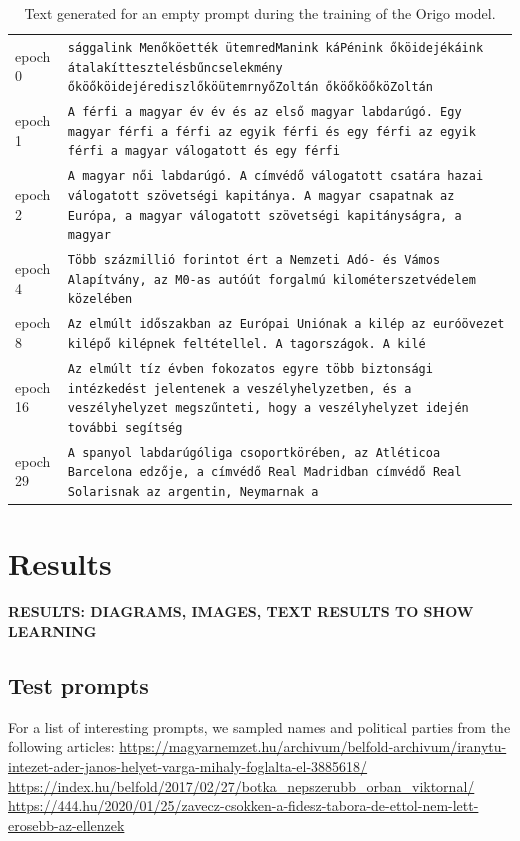 \documentclass[journal]{IEEEtai}
\begin{document}
\def\myrow#1#2{#1 & {\tt #2} \\}
\begin{table}
\centering
\begin{tabular}{lp{12cm}}
\myrow{epoch 0}{sággalink Menőköették ütemredManink káPénink őköidejékáink átalakíttesztelésbűncselekmény őköőköidejérediszlőköütemrnyőZoltán őköőköőköZoltán}
\myrow{epoch 1}{A férfi a magyar év év és az első magyar labdarúgó. Egy magyar férfi a férfi az egyik férfi és egy férfi az egyik férfi a magyar válogatott és egy férfi}
\myrow{epoch 2}{A magyar női labdarúgó. A címvédő válogatott csatára hazai válogatott szövetségi kapitánya. A magyar csapatnak az Európa, a magyar válogatott szövetségi kapitányságra, a magyar}
\myrow{epoch 4}{Több százmillió forintot ért a Nemzeti Adó- és Vámos Alapítvány, az M0-as autóút forgalmú kilométerszetvédelem közelében}
\myrow{epoch 8}{Az elmúlt időszakban az Európai Uniónak a kilép az euróövezet kilépő kilépnek feltétellel. A tagországok. A kilé}
\myrow{epoch 16}{Az elmúlt tíz évben fokozatos egyre több biztonsági intézkedést jelentenek a veszélyhelyzetben, és a veszélyhelyzet megszűnteti, hogy a veszélyhelyzet idején további segítség}
\myrow{epoch 29}{A spanyol labdarúgóliga csoportkörében, az Atléticoa Barcelona edzője, a címvédő Real Madridban címvédő Real Solarisnak az argentin, Neymarnak a}
\end{tabular}
\caption{Text generated for an empty prompt during the training of the Origo model.}
\label{fig:training_index}
\end{table}

\section{Results}
\textbf{RESULTS: DIAGRAMS, IMAGES, TEXT RESULTS TO SHOW LEARNING}

\subsection{Test prompts}
For a list of interesting prompts, we sampled names and political parties from the following articles:
\url{https://magyarnemzet.hu/archivum/belfold-archivum/iranytu-intezet-ader-janos-helyet-varga-mihaly-foglalta-el-3885618/} \\
\url{https://index.hu/belfold/2017/02/27/botka_nepszerubb_orban_viktornal/} \\
\url{https://444.hu/2020/01/25/zavecz-csokken-a-fidesz-tabora-de-ettol-nem-lett-erosebb-az-ellenzek} \\
\end{document}
